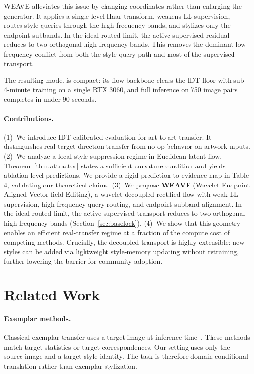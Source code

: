 \documentclass[letterpaper]{article}
\begin{document}
WEAVE alleviates this issue by changing coordinates rather than enlarging the generator.
It applies a single-level Haar transform, weakens LL supervision, routes style queries through the high-frequency bands, and stylizes only the endpoint subbands.
In the ideal routed limit, the active supervised residual reduces to two orthogonal high-frequency bands.
This removes the dominant low-frequency conflict from both the style-query path and most of the supervised transport.

The resulting model is compact: its flow backbone clears the IDT floor with sub-4-minute training on a single RTX 3060, and full inference on 750 image pairs completes in under 90 seconds.

\paragraph{Contributions.}
(1)~We introduce IDT-calibrated evaluation for art-to-art transfer.
It distinguishes real target-direction transfer from no-op behavior on artwork inputs.
(2)~We analyze a local style-suppression regime in Euclidean latent flow.
Theorem~\ref{thm:attractor} states a sufficient curvature condition and yields ablation-level predictions. We provide a rigid prediction-to-evidence map in Table 4, validating our theoretical claims.
(3)~We propose \textbf{WEAVE} (Wavelet-Endpoint Aligned Vector-field Editing), a wavelet-decoupled rectified flow with weak LL supervision, high-frequency query routing, and endpoint subband alignment.
In the ideal routed limit, the active supervised transport reduces to two orthogonal high-frequency bands (Section~\ref{sec:baselock}).
(4)~We show that this geometry enables an efficient real-transfer regime at a fraction of the compute cost of competing methods. Crucially, the decoupled transport is highly extensible: new styles can be added via lightweight style-memory updating without retraining, further lowering the barrier for community adoption.

\section{Related Work}
\label{sec:related}

\paragraph{Exemplar methods.}
Classical exemplar transfer uses a target image at inference time~\cite{gatys2015neural,gatys2016image,huang2017adain,li2017universal,deng2022stytr2,huang2024aesfa}.
These methods match target statistics or target correspondences.
Our setting uses only the source image and a target style identity.
The task is therefore domain-conditional translation rather than exemplar stylization.
\end{document}
